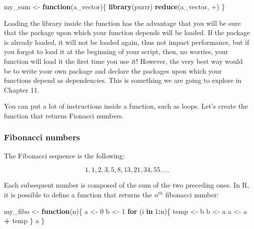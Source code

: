 \documentclass[
]{article}
\newenvironment{Shaded}{\begin{snugshade}}{\end{snugshade}}
\newcommand{\ControlFlowTok}[1]{\textcolor[rgb]{0.13,0.29,0.53}{\textbf{#1}}}
\newcommand{\DataTypeTok}[1]{\textcolor[rgb]{0.13,0.29,0.53}{#1}}
\newcommand{\DecValTok}[1]{\textcolor[rgb]{0.00,0.00,0.81}{#1}}
\newcommand{\KeywordTok}[1]{\textcolor[rgb]{0.13,0.29,0.53}{\textbf{#1}}}
\newcommand{\NormalTok}[1]{#1}
\newcommand{\OperatorTok}[1]{\textcolor[rgb]{0.81,0.36,0.00}{\textbf{#1}}}
\newcommand{\StringTok}[1]{\textcolor[rgb]{0.31,0.60,0.02}{#1}}
\begin{document}
\begin{Shaded}
\begin{Highlighting}[]
\NormalTok{my\_sum \textless{}{-}}\StringTok{ }\ControlFlowTok{function}\NormalTok{(a\_vector)\{}
  \KeywordTok{library}\NormalTok{(purrr)}
  \KeywordTok{reduce}\NormalTok{(a\_vector, }\StringTok{\textasciigrave{}}\DataTypeTok{+}\StringTok{\textasciigrave{}}\NormalTok{)}
\NormalTok{\}}
\end{Highlighting}
\end{Shaded}

Loading the library inside the function has the advantage that you will be sure that the package
upon which your function depends will be loaded. If the package is already loaded, it will not be
loaded again, thus not impact performance, but if you forgot to load it at the beginning of your
script, then, no worries, your function will load it the first time you use it! However, the very
best way would be to write your own package and declare the packages upon which your functions
depend as dependencies. This is something we are going to explore in Chapter 11.

You can put a lot of instructions inside a function, such as loops. Let's create the function that
returns Fionacci numbers.

\hypertarget{fibonacci-numbers}{%
\subsubsection{Fibonacci numbers}\label{fibonacci-numbers}}

The Fibonacci sequence is the following:

\[1, 1, 2, 3, 5, 8, 13, 21, 34, 55, ...\]

Each subsequent number is composed of the sum of the two preceding ones. In R, it is possible to define a function that returns the \(n^{th}\) fibonacci number:

\begin{Shaded}
\begin{Highlighting}[]
\NormalTok{my\_fibo \textless{}{-}}\StringTok{ }\ControlFlowTok{function}\NormalTok{(n)\{}
\NormalTok{ a \textless{}{-}}\StringTok{ }\DecValTok{0}
\NormalTok{ b \textless{}{-}}\StringTok{ }\DecValTok{1}
 \ControlFlowTok{for}\NormalTok{ (i }\ControlFlowTok{in} \DecValTok{1}\OperatorTok{:}\NormalTok{n)\{}
\NormalTok{  temp \textless{}{-}}\StringTok{ }\NormalTok{b}
\NormalTok{  b \textless{}{-}}\StringTok{ }\NormalTok{a}
\NormalTok{  a \textless{}{-}}\StringTok{ }\NormalTok{a }\OperatorTok{+}\StringTok{ }\NormalTok{temp}
\NormalTok{ \}}
\NormalTok{ a}
\NormalTok{\}}
\end{Highlighting}
\end{Shaded}
\end{document}
